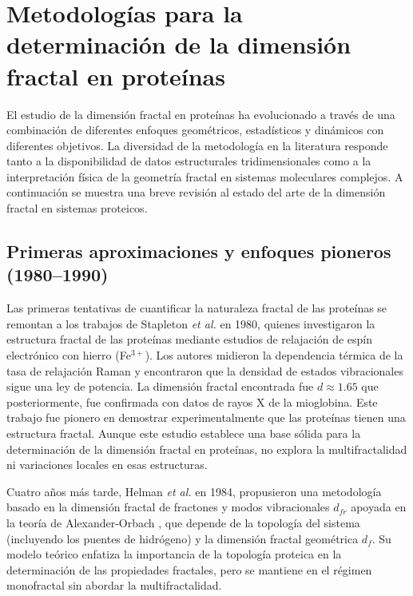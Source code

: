 \section{Metodolog\'{i}as para la determinaci\'{o}n de la dimensi\'{o}n fractal en prote\'{i}nas}

El estudio de la dimensi\'{o}n fractal en prote\'{i}nas ha evolucionado a trav\'{e}s de una combinaci\'{o}n de diferentes enfoques geom\'{e}tricos, estad\'{i}sticos y din\'{a}micos con diferentes objetivos. La diversidad de la metodolog\'{i}a en la literatura responde tanto a la disponibilidad de datos estructurales tridimensionales como a la interpretaci\'{o}n f\'{i}sica de la geometr\'{i}a fractal en sistemas moleculares complejos. A continuaci\'{o}n se muestra una breve revisi\'{o}n al estado del arte de la dimensi\'{o}n fractal en sistemas proteicos.

\subsection{Primeras aproximaciones y enfoques pioneros (1980--1990)}

Las primeras tentativas de cuantificar la naturaleza fractal de las prote\'{i}nas se remontan a los trabajos de Stapleton \textit{et al.}\cite{Stapleton1980} en 1980, quienes investigaron la estructura fractal de las prote\'{i}nas mediante estudios de relajaci\'{o}n de esp\'{i}n electr\'{o}nico con hierro (Fe$^{3+}$). Los autores midieron la dependencia t\'{e}rmica de la tasa de relajaci\'{o}n Raman y encontraron que la densidad de estados vibracionales sigue una ley de potencia. La dimensi\'{o}n fractal encontrada fue $d \approx 1.65$ que posteriormente, fue confirmada con datos de rayos X de la mioglobina. Este trabajo fue pionero en demostrar experimentalmente que las prote\'{i}nas tienen una estructura fractal. Aunque este estudio establece una base sólida para la determinación de la dimensión fractal en proteínas, no explora la multifractalidad ni variaciones locales en esas estructuras.

Cuatro años m\'{a}s tarde, Helman \textit{et al.}\cite{Helman1984} en 1984, propusieron una metodolog\'{i}a basado en la dimensi\'{o}n fractal de fractones y modos vibracionales $d_{fr}$ apoyada en la teor\'{i}a de Alexander-Orbach \cite{Alexander1982}, que depende de la topolog\'{i}a del sistema (incluyendo los puentes de hidr\'{o}geno) y la dimensi\'{o}n fractal geom\'{e}trica $d_f$. Su modelo teórico enfatiza la importancia de la topología proteica en la determinación de las propiedades fractales, pero se mantiene en el régimen monofractal sin abordar la multifractalidad.



